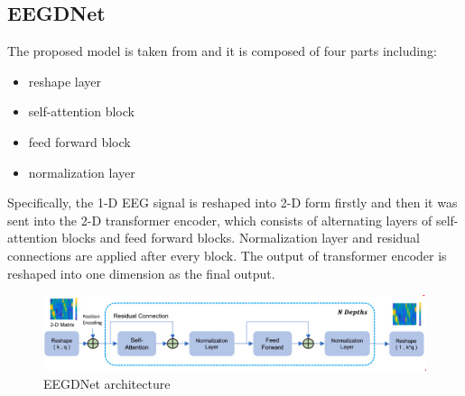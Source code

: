 \documentclass[a4paper]{sapthesis}
\begin{document}
\subsection{EEGDNet}\label{sec:EEGDNet}
The proposed  model is taken from\cite{EEGDNet} and it is
composed of four parts including:
\begin{itemize}
\item reshape layer
\item self-attention block
\item feed forward block
\item normalization layer
\end{itemize}
 Specifically, the 1-D EEG signal is reshaped into 2-D form firstly and then 
 it was sent into the 2-D transformer encoder, which consists of 
 alternating layers of self-attention blocks and feed forward blocks. 
 Normalization layer and residual connections are applied after every block.
  The output of transformer encoder is reshaped into one dimension as the
   final output. 
\begin{figure}[h!]
\centering
\includegraphics[width=1\linewidth]{images/model_architecture_transformer_fully_connected.PNG}
\caption{EEGDNet architecture}
\end{figure}
\end{document}
